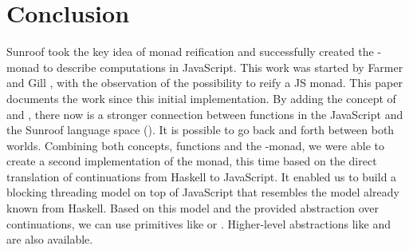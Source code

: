  
\section{Conclusion}

Sunroof took the key idea of monad reification and
successfully created the \JS-monad to describe computations
in JavaScript. This work was started by Farmer and
Gill \cite{Farmer:12:WebDSLs}, with the observation
of the possibility to reify a JS monad.
This paper documents the work since this initial implementation.
By adding the concept 
of  and , there now is a 
stronger connection between
functions in the JavaScript and the Sunroof language space 
(). It is possible to go back and forth between 
both worlds. Combining both concepts, functions and the \JS-monad,
we were able to create a second implementation of the monad, this
time based on the direct translation of continuations from Haskell
to JavaScript. It enabled us to build a blocking threading model
on top of JavaScript that resembles the model already known from Haskell.
Based on this model and the provided abstraction over continuations,
we can use primitives like  or .
Higher-level abstractions like  and  are also
available. 
